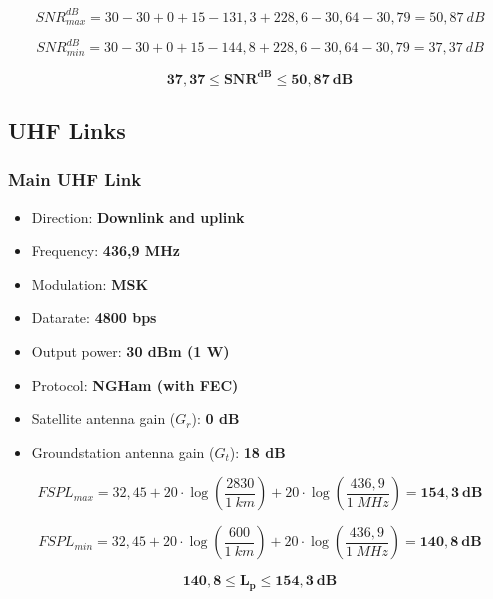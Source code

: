 \begin{equation}
SNR^{dB}_{max} = 30 - 30 + 0 + 15 - 131,3 + 228,6 - 30,64 - 30,79 = 50,87\ dB
\end{equation}

\begin{equation}
SNR^{dB}_{min} = 30 - 30 + 0 + 15 - 144,8 + 228,6 -30,64 -30,79 = 37,37\ dB
\end{equation}

\begin{equation}
\mathbf{37,37 \leq SNR^{dB} \leq 50,87\ dB}
\end{equation}

\subsection{UHF Links}

\subsubsection{Main UHF Link}

\begin{itemize}
    \item Direction: \textbf{Downlink and uplink}
    \item Frequency: \textbf{436,9 MHz}
    \item Modulation: \textbf{MSK}
    \item Datarate: \textbf{4800 bps}
    \item Output power: \textbf{30 dBm (1 W)}
    \item Protocol: \textbf{NGHam (with FEC)}
    \item Satellite antenna gain ($G_{r}$): \textbf{0 dB}
    \item Groundstation antenna gain ($G_{t}$): \textbf{18 dB}
\end{itemize}

\begin{equation}
FSPL_{max} = 32,45 + 20\cdot \log\left(\frac{2830}{1\ km}\right) + 20\cdot \log\left(\frac{436,9}{1\ MHz}\right) = \mathbf{154,3\ dB}
\end{equation}

\begin{equation}
FSPL_{min} = 32,45 + 20\cdot \log\left(\frac{600}{1\ km}\right) + 20\cdot \log\left(\frac{436,9}{1\ MHz}\right) = \mathbf{140,8\ dB}
\end{equation}

\begin{equation}
\mathbf{140,8 \leq L_{p} \leq 154,3\ dB}
\end{equation}

